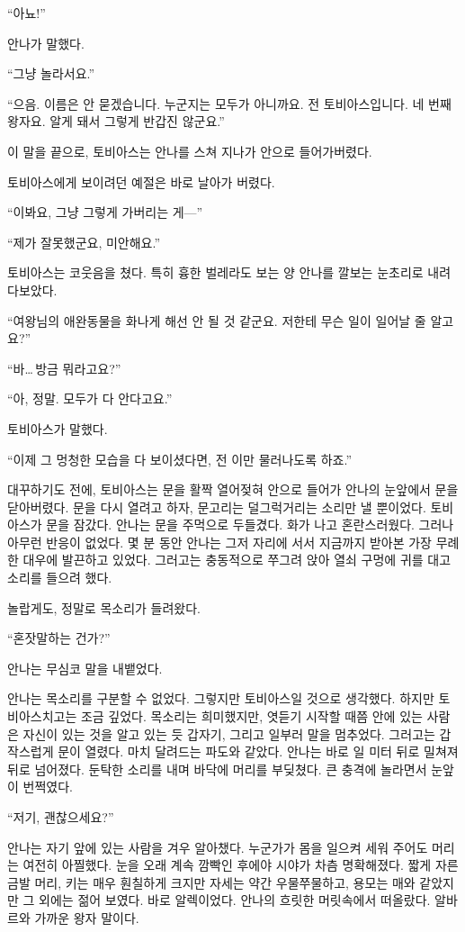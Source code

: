 ``아뇨!''

안나가 말했다.

``그냥 놀라서요.''

``으음. 이름은 안 묻겠습니다. 누군지는 모두가 아니까요. 전 토비아스입니다. 네 번째 왕자요. 알게 돼서 그렇게 반갑진 않군요.''

이 말을 끝으로, 토비아스는 안나를 스쳐 지나가 안으로 들어가버렸다.

토비아스에게 보이려던 예절은 바로 날아가 버렸다.

``이봐요, 그냥 그렇게 가버리는 게—''

``제가 잘못했군요, 미안해요.''

토비아스는 코웃음을 쳤다. 특히 흉한 벌레라도 보는 양 안나를 깔보는 눈초리로 내려다보았다.

``여왕님의 애완동물을 화나게 해선 안 될 것 같군요. 저한테 무슨 일이 일어날 줄 알고요?''

``바\ldots\,방금 뭐라고요?''

``아, 정말. 모두가 다 안다고요.''

토비아스가 말했다.

``이제 그 멍청한 모습을 다 보이셨다면, 전 이만 물러나도록 하죠.''

대꾸하기도 전에, 토비아스는 문을 활짝 열어젖혀 안으로 들어가 안나의 눈앞에서 문을 닫아버렸다. 문을 다시 열려고 하자, 문고리는 덜그럭거리는 소리만 낼 뿐이었다. 토비아스가 문을 잠갔다. 안나는 문을 주먹으로 두들겼다. 화가 나고 혼란스러웠다. 그러나 아무런 반응이 없었다. 몇 분 동안 안나는 그저 자리에 서서 지금까지 받아본 가장 무례한 대우에 발끈하고 있었다. 그러고는 충동적으로 쭈그려 앉아 열쇠 구멍에 귀를 대고 소리를 들으려 했다.

놀랍게도, 정말로 목소리가 들려왔다.

``혼잣말하는 건가?''

안나는 무심코 말을 내뱉었다.

안나는 목소리를 구분할 수 없었다. 그렇지만 토비아스일 것으로 생각했다. 하지만 토비아스치고는 조금 깊었다. 목소리는 희미했지만, 엿듣기 시작할 때쯤 안에 있는 사람은 자신이 있는 것을 알고 있는 듯 갑자기, 그리고 일부러 말을 멈추었다. 그러고는 갑작스럽게 문이 열렸다. 마치 달려드는 파도와 같았다. 안나는 바로 일 미터 뒤로 밀쳐져 뒤로 넘어졌다. 둔탁한 소리를 내며 바닥에 머리를 부딪쳤다. 큰 충격에 놀라면서 눈앞이 번쩍였다.

``저기, 괜찮으세요?''

안나는 자기 앞에 있는 사람을 겨우 알아챘다. 누군가가 몸을 일으켜 세워 주어도 머리는 여전히 아찔했다. 눈을 오래 계속 깜빡인 후에야 시야가 차츰 명확해졌다. 짧게 자른 금발 머리, 키는 매우 훤칠하게 크지만 자세는 약간 우물쭈물하고, 용모는 매와 같았지만 그 외에는 젊어 보였다. 바로 알렉이었다. 안나의 흐릿한 머릿속에서 떠올랐다. 알바르와 가까운 왕자 말이다.

